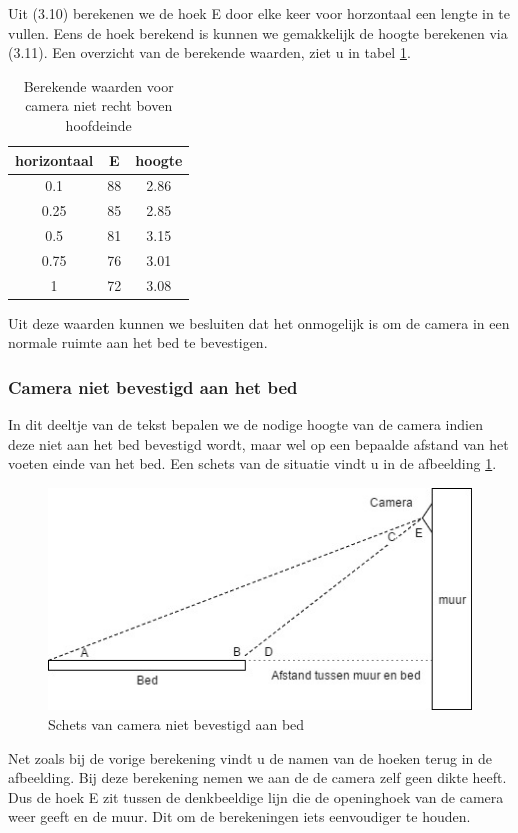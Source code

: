 Uit (3.10) berekenen we de hoek E door elke keer voor horzontaal een lengte in te vullen. Eens de hoek berekend is kunnen we gemakkelijk de hoogte berekenen via (3.11). Een overzicht van de berekende waarden, ziet u in tabel \ref{refTabCNRBB}.
\begin{table}[h]
	\begin{tabular}{|c|c|c|}
		\hline
		horizontaal & E & hoogte \\ \hline
		0.1 & 88 & 2.86 \\ \hline
		0.25 & 85 & 2.85 \\ \hline
		0.5 & 81 & 3.15 \\ \hline
		0.75 & 76 & 3.01 \\ \hline
		1 &  72 & 3.08 \\
		\hline
	\end{tabular}
	\caption{Berekende waarden voor camera niet recht boven hoofdeinde}
	\label{refTabCNRBB}
\end{table}
Uit deze waarden kunnen we besluiten dat het onmogelijk is om de camera in een normale ruimte aan het bed te bevestigen.

\subsubsection{Camera niet bevestigd aan het bed}
In dit deeltje van de tekst bepalen we de nodige hoogte van de camera indien deze niet aan het bed bevestigd wordt, maar wel op een bepaalde afstand van het voeten einde van het bed. Een schets van de situatie vindt u in de afbeelding \ref{imgCNB}. 
\begin{figure}[h]
	\includegraphics[scale=0.75]{CameraNietAanBed}
	\caption{Schets van camera niet bevestigd aan bed}
	\label{imgCNB}
\end{figure}
Net zoals bij de vorige berekening vindt u de namen van de hoeken terug in de afbeelding. Bij deze berekening nemen we aan de de camera zelf geen dikte heeft. Dus de hoek E zit tussen de denkbeeldige lijn die de openinghoek van de camera weer geeft en de muur. Dit om de berekeningen iets eenvoudiger te houden. 


